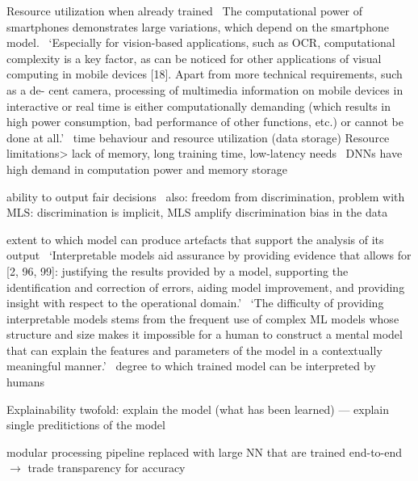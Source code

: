 Resource utilization when already trained~\citep{siebert_construction_2021}
The computational power of smartphones demonstrates large variations, which depend on the
smartphone model.~\cite{sourvanos_challenges_2018}
`Especially for vision-based applications, such as OCR, computational complexity is a key factor, as can be noticed for other applications of visual computing in mobile devices [18]. Apart from more technical requirements, such as a de- cent camera, processing of multimedia information on mobile devices in interactive or real time is either computationally demanding (which results in high power consumption, bad performance of other functions, etc.) or cannot be done at all.'~\cite{sourvanos_challenges_2018}
time behaviour and resource utilization (data storage)\cite{nakamichi_requirements-driven_2020}
Resource limitations> lack of memory, long training time, low-latency needs~\cite{arpteg_software_2018}
DNNs have high demand in computation power and memory storage~\cite{niu_26ms_2019}

ability to output fair decisions~\cite{siebert_construction_2021}
also: freedom from discrimination, problem with \ac{MLS}: discrimination is implicit, \ac{MLS} amplify
discrimination bias in the data~\cite{vogelsang_requirements_2019}

extent to which model can produce artefacts that support the analysis of its
output~\citep{ashmore_assuring_2021}
`Interpretable models aid assurance by providing evidence that allows for [2, 96, 99]: justifying the results provided by a model, supporting the identification and correction of errors, aiding model improvement, and providing insight with respect to the operational domain.'~\citep{ashmore_assuring_2021}
`The difficulty of providing interpretable models stems from the frequent use of complex ML models whose structure and size makes it impossible for a human to construct a mental model that can explain the features and parameters of the model in a contextually meaningful manner.'~\citep{ashmore_assuring_2021}
degree to which trained model can be interpreted by humans~\cite{siebert_construction_2021}

Explainability twofold: explain the model (what has been learned) --- explain single
preditictions of the model~\cite{vogelsang_requirements_2019}

modular processing pipeline replaced with large NN that are trained end-to-end
$\rightarrow$ trade transparency for accuracy~\cite{arpteg_software_2018}

